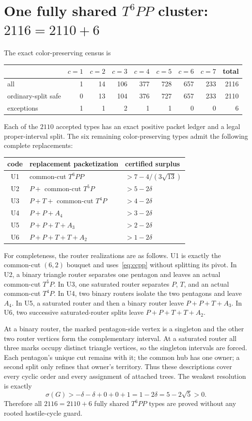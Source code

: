 \documentclass[11pt]{article}
\newcommand{\sig}{\sigma}
\begin{document}
\section{\texorpdfstring{One fully shared $T^6PP$ cluster: $2116=2110+6$}{One fully shared T6PP cluster: 2116=2110+6}}

The exact color-preserving census is
\begin{center}
\begin{tabular}{lrrrrrrr|r}
\toprule
&$c=1$&$c=2$&$c=3$&$c=4$&$c=5$&$c=6$&$c=7$&total\\
\midrule
all&1&14&106&377&728&657&233&2116\\
ordinary-split safe&0&13&104&376&727&657&233&2110\\
exceptions&1&1&2&1&1&0&0&6\\
\bottomrule
\end{tabular}
\end{center}
Each of the $2110$ accepted types has an exact positive packet ledger and a
legal proper-interval split.  The six remaining color-preserving types admit
the following complete replacements:
\begin{center}
\begin{tabular}{cll}
\toprule
code&replacement packetization&certified surplus\\
\midrule
U1&common-cut $T^6PP$&$>7-4/(3\sqrt{13})$\\
U2&$P+$ common-cut $T^5P$&$>5-2\delta$\\
U3&$P+T+$ common-cut $T^4P$&$>4-2\delta$\\
U4&$P+P+A_4$&$>3-2\delta$\\
U5&$P+P+T+A_3$&$>2-2\delta$\\
U6&$P+P+T+T+A_2$&$>1-2\delta$\\
\bottomrule
\end{tabular}
\end{center}
For completeness, the router realizations are as follows.  U1 is exactly the
common-cut $(6,2)$ bouquet and uses~\eqref{eq:ccpp} without splitting its
pivot.  In U2, a binary triangle router separates one pentagon and leaves an
actual common-cut $T^5P$.  In U3, one saturated router separates $P$, $T$, and
an actual common-cut $T^4P$.  In U4, two binary routers isolate the two
pentagons and leave $A_4$.  In U5, a saturated router and then a binary router
leave $P+P+T+A_3$.  In U6, two successive saturated-router splits leave
$P+P+T+T+A_2$.

At a binary router, the marked pentagon-side vertex is a singleton and the
other two router vertices form the complementary interval.  At a saturated
router all three marks occupy distinct triangle vertices, so the singleton
intervals are forced.  Each pentagon's unique cut remains with it; the common
hub has one owner; a second split only refines that owner's territory.  Thus
these descriptions cover every cyclic order and every assignment of attached
trees.  The weakest resolution is exactly
\[
 \sig(G)>-\delta-\delta+0+0+1
          =1-2\delta=5-2\sqrt5>0.
\]
Therefore all $2116=2110+6$ fully shared $T^6PP$ types are proved without any
rooted hostile-cycle guard.
\end{document}
